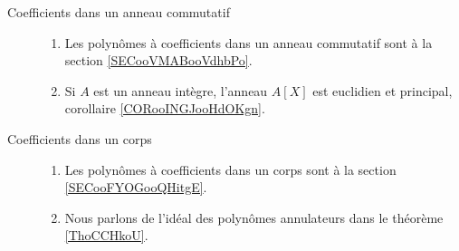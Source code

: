 
\begin{description}
    \item[Coefficients dans un anneau commutatif]

        \begin{enumerate}
            \item
Les polynômes à coefficients dans un anneau commutatif  sont à la section \ref{SECooVMABooVdhbPo}.
\item Si \( A\) est un anneau intègre, l'anneau \( A[X]\) est euclidien et principal, corollaire \ref{CORooINGJooHdOKgn}.
        \end{enumerate}
        

    \item[Coefficients dans un corps]
        \begin{enumerate}
            \item
                
Les polynômes à coefficients dans un corps sont à la section \ref{SECooFYOGooQHitgE}.
\item
Nous parlons de l'idéal des polynômes annulateurs dans le théorème \ref{ThoCCHkoU}.
        \end{enumerate}
\end{description}



